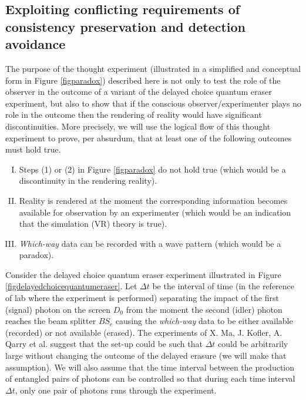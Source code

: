 \documentclass[11pt]{article}
\theoremstyle{definition}
\begin{document}
\subsection{Exploiting conflicting requirements of consistency preservation and detection avoidance}\label{seclkjhjhu}
The purpose of the thought experiment (illustrated in a simplified and conceptual form in Figure \ref{figparadox}) described here is not only to
test the role of the observer in the outcome of a variant of the delayed choice quantum eraser experiment, but also to show that if the conscious observer/experimenter plays no role in the outcome then  the rendering of reality would have significant discontinuities.
More precisely, we will use the logical flow of this thought experiment to prove, per absurdum, that at least one of the following outcomes must hold true.
\begin{enumerate}[(I)]
\item  Steps (1) or (2) in Figure \ref{figparadox} do not hold true (which would be a discontinuity in the rendering reality).
\item Reality is rendered at the moment the corresponding information becomes available for observation by an experimenter (which would be an indication that the simulation (VR) theory is true).
\item \emph{Which-way} data can be recorded with a wave pattern (which would be a paradox).
\end{enumerate}

Consider  the delayed choice quantum eraser experiment  \cite{scully1982quantum, kim2000delayed} illustrated in Figure \ref{figdelayedchoicequantumeraser}.  Let $\Delta t$ be the interval of time (in the reference of lab where the experiment is performed) separating the impact of the first (signal) photon on the screen $D_0$ from the  moment the second (idler) photon reaches the beam splitter $BS_c$ causing the \emph{which-way} data to be either available (recorded) or not available (erased).
The experiments of X. Ma, J. Kofler, A. Qarry et al. \cite{ma2013quantum} suggest that the set-up could be such that $\Delta t$ could be arbitrarily large without changing the outcome of the delayed erasure (we will make that assumption). We will also assume that the time interval between the production of entangled pairs of photons can be controlled so that during each time interval $\Delta t$, only one pair of photons runs through the experiment.
\end{document}
